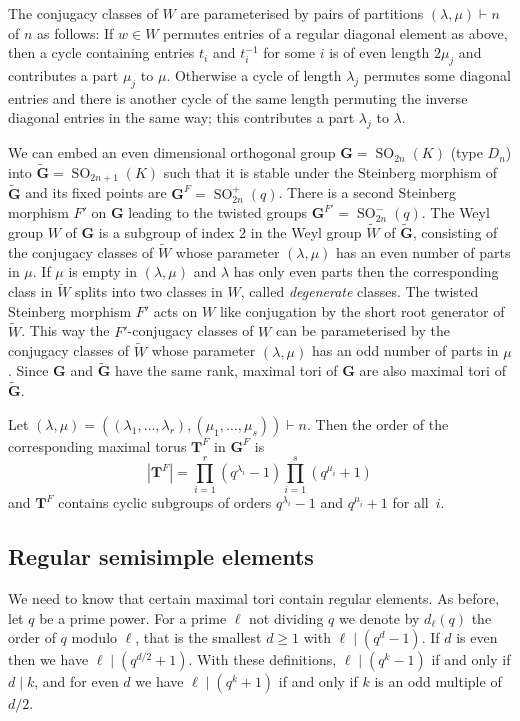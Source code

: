 \documentclass{ert-l}
\newcommand{\bG}{{\mathbf{G}}}
\newcommand{\bT}{{\mathbf{T}}}
\newcommand{\SO}{{\operatorname{SO}}}
\let\la=\lambda
\theoremstyle{definition}
\theoremstyle{remark}
\begin{document}
The conjugacy classes of $W$ are parameterised by pairs of partitions
$(\lambda,\mu) \vdash n$ of $n$ as follows: If $w \in W$ permutes entries of
a regular diagonal element as above, then a cycle containing entries $t_i$ and
$t_i^{-1}$ for some $i$ is of even length $2\mu_j$ and contributes a part
$\mu_j$ to $\mu$. Otherwise a cycle of length $\lambda_j$ permutes some
diagonal entries and there is another cycle of the same length permuting the
inverse diagonal entries in the same way; this contributes a part
$\lambda_j$ to $\lambda$.

We can embed an even dimensional orthogonal group $\bG = \SO_{2n}(K)$
(type $D_n$) into $\tilde\bG = \SO_{2n+1}(K)$ such that it is stable under
the Steinberg morphism of $\tilde\bG$ and its fixed points are $\bG^F =
\SO^+_{2n}(q)$. There is a second Steinberg morphism $F'$ on $\bG$
leading to the twisted groups $\bG^{F'} = \SO^-_{2n}(q)$.
The Weyl group $W$ of $\bG$ is a subgroup of index $2$ in the Weyl group
$\tilde{W}$ of $\tilde\bG$, consisting of the conjugacy classes of $\tilde W$
whose parameter $(\lambda,\mu)$ has an even number of parts in $\mu$. If
$\mu$ is empty in $(\lambda,\mu)$  and $\lambda$ has only even parts then
the corresponding class in $\tilde W$ splits into two classes in $W$, called
\emph{degenerate} classes. The twisted Steinberg morphism  $F'$ acts on $W$
like conjugation by the short root generator of $\tilde W$. This way the
$F'$-conjugacy classes of $W$ can be parameterised by the conjugacy classes
of $\tilde W$ whose parameter $(\lambda, \mu)$ has an odd number of parts in
$\mu$. Since $\bG$ and $\tilde\bG$ have the same rank, maximal tori of $\bG$
are also maximal tori of $\tilde\bG$.

Let $(\la,\mu) = ((\la_1, \ldots, \la_r),(\mu_1,\ldots,\mu_s)) \vdash n$.
Then the order of the corresponding maximal torus $\bT^F$ in $\bG^F$ is
\[ |\bT^F| = \prod_{i=1}^{r}(q^{\la_i}-1) \prod_{i=1}^{s}(q^{\mu_i}+1) \]
and $\bT^F$ contains cyclic subgroups of orders $q^{\la_i}-1$ and
$q^{\mu_i}+1$ for all~$i$.

\subsection{Regular semisimple elements}\label{subsec:regss}
We need to know that certain maximal tori contain regular elements. As before,
let $q$ be a prime power. For a prime $\ell$ not dividing $q$ we denote by
$d_\ell(q)$ the order of $q$ modulo $\ell$, that is the smallest $d\ge1$ with
$\ell \mid (q^d-1)$. If $d$ is even then we have $\ell \mid (q^{d/2}+1)$.
With these definitions, $\ell \mid (q^k-1)$ if and only if $d \mid k$, and for
even $d$ we have $\ell \mid (q^k+1)$ if and only if $k$ is an odd multiple
of $d/2$.
\end{document}
